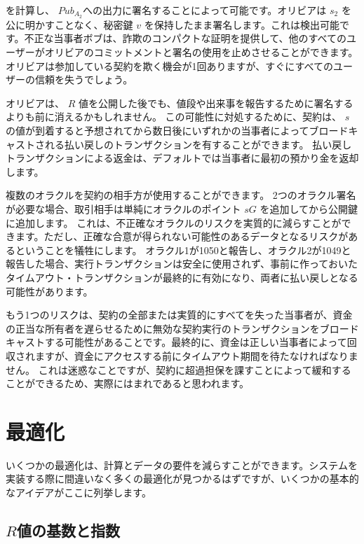 \documentclass[11pt]{article}
\begin{document}
を計算し、 \(Pub_{A_2}\)への出力に署名することによって可能です。オリビアは \(s_2\) を公に明かすことなく、秘密鍵 \(v\) を保持したまま署名します。これは検出可能です。不正な当事者ボブは、詐欺のコンパクトな証明を提供して、他のすべてのユーザーがオリビアのコミットメントと署名の使用を止めさせることができます。 オリビアは参加している契約を欺く機会が1回ありますが、すぐにすべてのユーザーの信頼を失うでしょう。

オリビアは、 \(R\) 値を公開した後でも、値段や出来事を報告するために署名するよりも前に消えるかもしれません。 この可能性に対処するために、契約は、 \(s\) の値が到着すると予想されてから数日後にいずれかの当事者によってブロードキャストされる払い戻しのトランザクションを有することができます。 払い戻しトランザクションによる返金は、デフォルトでは当事者に最初の預かり金を返却します。

複数のオラクルを契約の相手方が使用することができます。 2つのオラクル署名が必要な場合、取引相手は単純にオラクルのポイント \(sG\) を追加してから公開鍵に追加します。 これは、不正確なオラクルのリスクを実質的に減らすことができます。ただし、正確な合意が得られない可能性のあるデータとなるリスクがあるということを犠牲にします。 オラクル1が1050と報告し、オラクル2が1049と報告した場合、実行トランザクションは安全に使用されず、事前に作っておいたタイムアウト・トランザクションが最終的に有効になり、両者に払い戻しとなる可能性があります。

もう1つのリスクは、契約の全部または実質的にすべてを失った当事者が、資金の正当な所有者を遅らせるために無効な契約実行のトランザクションをブロードキャストする可能性があることです。最終的に、資金は正しい当事者によって回収されますが、資金にアクセスする前にタイムアウト期間を待たなければなりません。 これは迷惑なことですが、契約に超過担保を課すことによって緩和することができるため、実際にはまれであると思われます。

\section*{最適化}

いくつかの最適化は、計算とデータの要件を減らすことができます。システムを実装する際に間違いなく多くの最適化が見つかるはずですが、いくつかの基本的なアイデアがここに列挙します。

\subsection*{\(R\)値の基数と指数}
\end{document}
